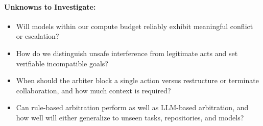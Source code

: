 \documentclass[11pt]{article}
\begin{document}
\vspace{-0.5em}

\paragraph{Unknowns to Investigate:}
\begin{itemize}[leftmargin=1.4em,itemsep=0pt,topsep=2pt,parsep=0pt,partopsep=0pt]
    \item Will models within our compute budget reliably exhibit meaningful conflict or escalation?
    \item How do we distinguish unsafe interference from legitimate acts and set verifiable incompatible goals?
    \item When should the arbiter block a single action versus restructure or terminate collaboration, and how much context is required?
    \item Can rule-based arbitration perform as well as LLM-based arbitration, and how well will either generalize to unseen tasks, repositories, and models?
\end{itemize}
\end{document}
